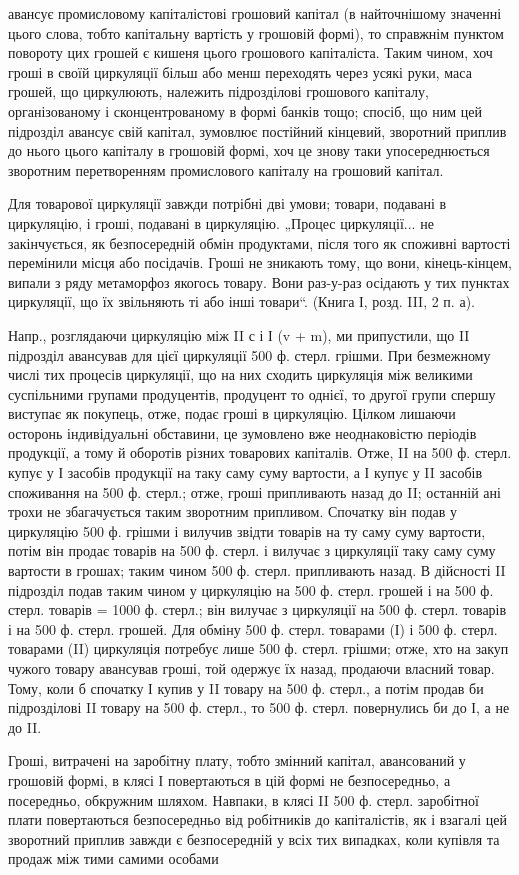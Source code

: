 \parcont{}  %
авансує промисловому капіталістові грошовий капітал (в найточнішому
значенні цього слова, тобто капітальну вартість у грошовій формі), то
справжнім пунктом повороту цих грошей є кишеня цього грошового
капіталіста. Таким чином, хоч гроші в своїй циркуляції більш або менш
переходять через усякі руки, маса грошей, що циркулюють, належить
підрозділові грошового капіталу, організованому і сконцентрованому в
формі банків тощо; спосіб, що ним цей підрозділ авансує свій капітал,
зумовлює постійний кінцевий, зворотний приплив до нього цього капіталу
в грошовій формі, хоч це знову таки упосереднюється зворотним перетворенням
промислового капіталу на грошовий капітал.

Для товарової циркуляції завжди потрібні дві умови; товари, подавані
в циркуляцію, і гроші, подавані в циркуляцію. „Процес циркуляції... не
закінчується, як безпосередній обмін продуктами, після того як споживні
вартості перемінили місця або посідачів. Гроші не зникають тому, що
вони, кінець-кінцем, випали з ряду метаморфоз якогось товару. Вони раз-у-раз
осідають у тих пунктах циркуляції, що їх звільняють ті або інші
товари“. (Книга І, розд. III, 2 п. а).

Напр., розглядаючи циркуляцію між II с і І (v + m), ми припустили,
що II підрозділ авансував для цієї циркуляції 500 ф. стерл. грішми. При
безмежному числі тих процесів циркуляції, що на них сходить циркуляція
між великими суспільними групами продуцентів, продуцент то
однієї, то другої групи спершу виступає як покупець, отже, подає
гроші в циркуляцію. Цілком лишаючи осторонь індивідуальні обставини,
це зумовлено вже неоднаковістю періодів продукції, а тому й оборотів
різних товарових капіталів. Отже, II на 500 ф. стерл. купує у І засобів
продукції на таку саму суму вартости, а І купує у II засобів споживання на
500 ф. стерл.; отже, гроші припливають назад до II; останній ані трохи
не збагачується таким зворотним припливом. Спочатку він подав у циркуляцію
500 ф. грішми і вилучив звідти товарів на ту саму суму вартости,
потім він продає товарів на 500 ф. стерл. і вилучає з циркуляції
таку саму суму вартости в грошах; таким чином 500 ф. стерл. припливають
назад. В дійсності II підрозділ подав таким чином у циркуляцію
на 500 ф. стерл. грошей і на 500 ф. стерл. товарів = 1000 ф. стерл.;
він вилучає з циркуляції на 500 ф. стерл. товарів і на 500 ф. стерл.
грошей. Для обміну 500 ф. стерл. товарами (І) і 500 ф. стерл. товарами
(II) циркуляція потребує лише 500 ф. стерл. грішми; отже,
хто на закуп чужого товару авансував гроші, той одержує їх
назад, продаючи власний товар. Тому, коли б спочатку І купив у II
товару на 500 ф. стерл., а потім продав би підрозділові II товару на
500 ф. стерл., то 500 ф. стерл. повернулись би до І, а не до II.

Гроші, витрачені на заробітну плату, тобто змінний капітал, авансований
у грошовій формі, в клясі І повертаються в цій формі не безпосередньо,
а посередньо, обкружним шляхом. Навпаки, в клясі II 500 ф.
стерл. заробітної плати повертаються безпосередньо від робітників до
капіталістів, як і взагалі цей зворотний приплив завжди є безпосередній
у всіх тих випадках, коли купівля та продаж між тими самими особами
\parbreak{}  %
